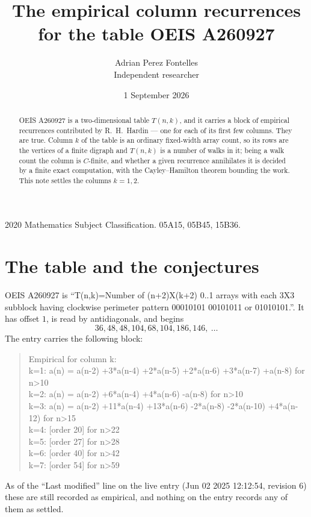 \documentclass[11pt,a4paper]{article}
\title{The empirical column recurrences for the table OEIS A260927}
\author{Adrian Perez Fontelles\\ \small Independent researcher}
\date{1 September 2026}
\theoremstyle{plain}
\theoremstyle{definition}
\begin{document}
\maketitle

\begin{abstract}
OEIS A260927 is a two-dimensional table $T(n,k)$, and it carries a block of empirical
recurrences contributed by R.~H.~Hardin --- one for each of its first few columns. They are
true. Column $k$ of the table is an ordinary fixed-width array count, so its rows are the
vertices of a finite digraph and $T(n,k)$ is a number of walks in it; being a walk count the
column is $C$-finite, and whether a given recurrence annihilates it is decided by a finite
exact computation, with the Cayley--Hamilton theorem bounding the work. This note settles the columns $k=1, 2$.
\end{abstract}

\noindent\small 2020 Mathematics Subject Classification. 05A15, 05B45, 15B36.\normalsize

\section{The table and the conjectures}

OEIS A260927 is ``T(n,k)=Number of (n+2)X(k+2) 0..1 arrays with each 3X3 subblock having clockwise perimeter pattern 00010101 00101011 or 01010101.''. It has offset $1$, is
read by antidiagonals, and begins
\[
36, 48, 48, 104, 68, 104, 186, 146,\ \dots
\]
The entry carries the following block:
\begin{quote}\small
Empirical for column k:\\
k=1: a(n) = a(n-2) +3*a(n-4) +2*a(n-5) +2*a(n-6) +3*a(n-7) +a(n-8) for n>10\\
k=2: a(n) = a(n-2) +6*a(n-4) +4*a(n-6) -a(n-8) for n>10\\
k=3: a(n) = a(n-2) +11*a(n-4) +13*a(n-6) -2*a(n-8) -2*a(n-10) +4*a(n-12) for n>15\\
k=4: [order 20] for n>22\\
k=5: [order 27] for n>28\\
k=6: [order 40] for n>42\\
k=7: [order 54] for n>59\\
\end{quote}
As of the ``Last modified'' line on the live entry (Jun 02 2025 12:12:54, revision 6) these are still
recorded as empirical, and nothing on the entry records any of them as settled.
\end{document}
